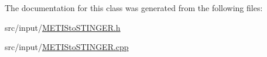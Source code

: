 The documentation for this class was generated from the following files\-:\begin{DoxyCompactItemize}
\item 
src/input/\hyperlink{_m_e_t_i_sto_s_t_i_n_g_e_r_8h}{M\-E\-T\-I\-Sto\-S\-T\-I\-N\-G\-E\-R.\-h}\item 
src/input/\hyperlink{_m_e_t_i_sto_s_t_i_n_g_e_r_8cpp}{M\-E\-T\-I\-Sto\-S\-T\-I\-N\-G\-E\-R.\-cpp}\end{DoxyCompactItemize}
